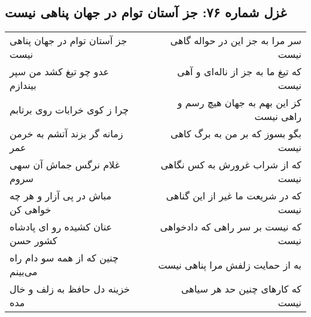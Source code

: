 \begin{center}
\section*{غزل شماره ۷۶: جز آستان توام در جهان پناهی نیست}
\label{sec:sh076}
\begin{longtable}{l p{0.5cm} r}
جز آستان توام در جهان پناهی نیست
&&
سر مرا به جز این در حواله گاهی نیست
\\
عدو چو تیغ کشد من سپر بیندازم
&&
که تیغ ما به جز از ناله‌ای و آهی نیست
\\
چرا ز کوی خرابات روی برتابم
&&
کز این بهم به جهان هیچ رسم و راهی نیست
\\
زمانه گر بزند آتشم به خرمن عمر
&&
بگو بسوز که بر من به برگ کاهی نیست
\\
غلام نرگس جماش آن سهی سروم
&&
که از شراب غرورش به کس نگاهی نیست
\\
مباش در پی آزار و هر چه خواهی کن
&&
که در شریعت ما غیر از این گناهی نیست
\\
عنان کشیده رو ای پادشاه کشور حسن
&&
که نیست بر سر راهی که دادخواهی نیست
\\
چنین که از همه سو دام راه می‌بینم
&&
به از حمایت زلفش مرا پناهی نیست
\\
خزینه دل حافظ به زلف و خال مده
&&
که کارهای چنین حد هر سیاهی نیست
\\
\end{longtable}
\end{center}
